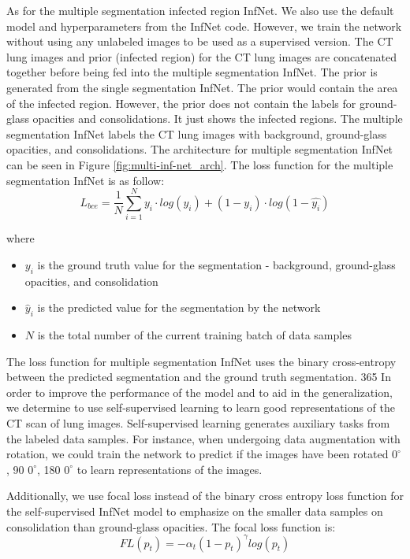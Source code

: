 As for the multiple segmentation infected region InfNet. We also use the default model and hyperparameters from the InfNet code. However, we train the network without using any unlabeled images to be used as a supervised version. The CT lung images and prior (infected region) for the CT lung images are concatenated together before being fed into the multiple segmentation InfNet. The prior is generated from the single segmentation InfNet. The prior would contain the area of the infected region. However, the prior does not contain the labels for ground-glass opacities and consolidations. It just shows the infected regions. The multiple segmentation InfNet labels the CT lung images with background, ground-glass opacities, and consolidations. The architecture for multiple segmentation InfNet can be seen in Figure \ref{fig:multi-inf-net_arch}. The loss function for the multiple segmentation InfNet is as follow:
\begin{equation}
L_{bce} = \frac{1}{N}\sum_{i=1}^{N} y_i \cdot log(\hat{y_i}) + (1-y_i)\cdot log(1-\hat{y_i})
\end{equation}

where 

\begin{itemize}
	\item $y_i$ is the ground truth value for the segmentation - background, ground-glass opacities, and consolidation
	\item $\hat{y}_i$ is the predicted value for the segmentation by the network
	\item $N$ is the total number of the current training batch of data samples
\end{itemize}

The loss function for multiple segmentation InfNet uses the binary cross-entropy between the predicted segmentation and the ground truth segmentation. 
365
%
In order to improve the performance of the model and to aid in the generalization, we determine to use self-supervised learning to learn good representations of the CT scan of lung images. Self-supervised learning generates auxiliary tasks from the labeled data samples. For instance, when undergoing data augmentation with rotation, we could train the network to predict if the images have been rotated $0^\circ$, 90 $0^\circ$, 180 $0^\circ$ to learn representations of the images. 

Additionally, we use focal loss instead of the binary cross entropy loss function for the self-supervised InfNet model to emphasize on the smaller data samples on consolidation than ground-glass opacities. The focal loss function is:
\begin{equation}
FL(p_t) = -\alpha _t(1-p_t)^\gamma log(p_t)
\end{equation}

